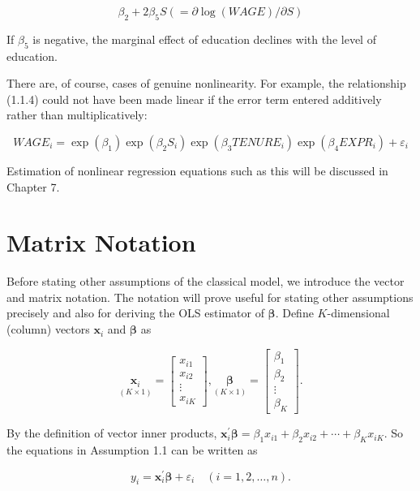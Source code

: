 \documentclass[10pt]{article}
\begin{document}
$$
\beta_{2}+2 \beta_{5} S(=\partial \log (W A G E) / \partial S)
$$

If $\beta_{5}$ is negative, the marginal effect of education declines with the level of education.

There are, of course, cases of genuine nonlinearity. For example, the relationship (1.1.4) could not have been made linear if the error term entered additively rather than multiplicatively:

$$
W A G E_{i}=\exp \left(\beta_{1}\right) \exp \left(\beta_{2} S_{i}\right) \exp \left(\beta_{3} T E N U R E_{i}\right) \exp \left(\beta_{4} E X P R_{i}\right)+\varepsilon_{i}
$$

Estimation of nonlinear regression equations such as this will be discussed in Chapter 7.

\section*{Matrix Notation}
Before stating other assumptions of the classical model, we introduce the vector and matrix notation. The notation will prove useful for stating other assumptions precisely and also for deriving the OLS estimator of $\boldsymbol{\beta}$. Define $K$-dimensional (column) vectors $\mathbf{x}_{i}$ and $\boldsymbol{\beta}$ as

\[
\underset{(K \times 1)}{\mathbf{x}_{i}}=\left[\begin{array}{c}
x_{i 1}  \tag{1.1.5}\\
x_{i 2} \\
\vdots \\
x_{i K}
\end{array}\right], \underset{(K \times 1)}{\boldsymbol{\beta}}=\left[\begin{array}{c}
\beta_{1} \\
\beta_{2} \\
\vdots \\
\beta_{K}
\end{array}\right] .
\]

By the definition of vector inner products, $\mathbf{x}_{i}^{\prime} \boldsymbol{\beta}=\beta_{1} x_{i 1}+\beta_{2} x_{i 2}+\cdots+\beta_{K} x_{i K}$. So the equations in Assumption 1.1 can be written as


\begin{equation*}
y_{i}=\mathbf{x}_{i}^{\prime} \boldsymbol{\beta}+\varepsilon_{i} \quad(i=1,2, \ldots, n) . \tag{1.1.1́}
\end{equation*}
\end{document}
